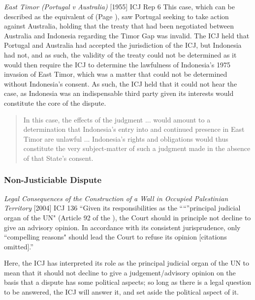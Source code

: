 \begin{casedetails}{\textit{East Timor (Portugal v Australia)} [1955] ICJ Rep 6}
    \flushleft
    This case, which can be described as the equivalent of  (Page \pageref{case:Horta v Commonwealth}), saw Portugal seeking to take action against Australia, holding that the treaty that had been negotiated between Australia and Indonesia regarding the Timor Gap was invalid. The ICJ held that Portugal and Australia had accepted the jurisdiction of the ICJ, but Indonesia had not, and as such, the validity of the treaty could not be determined as it would then require the ICJ to determine the lawfulness of Indonesia's 1975 invasion of East Timor, which was a matter that could not be determined without Indonesia's consent. As such, the ICJ held that it could not hear the case, as Indonesia was an indispensable third party given its interests would constitute the core of the dispute.

    \begin{quote}
        In this case, the effects of the judgment ... would amount to a determination that Indonesia's entry into and continued presence in East Timor are unlawful ... Indonesia's rights and obligations would thus constitute the very subject-matter of such a judgment made in the absence of that State's consent.
    \end{quote}
\end{casedetails}

\subsubsection{Non-Justiciable Dispute}
\begin{casedetails}{\textit{Legal Consequences of the Construction of a Wall in Occupied Palestinian Territory} [2004] ICJ 136}
    \flushleft
    ``Given its responsibilities as the ``“''principal judicial organ of the UN" (Article 92 of the ), the Court should in principle not decline to give an advisory opinion. In accordance with its consistent jurisprudence, only ``compelling reasons" should lead the Court to refuse its opinion [citations omitted].''

    \vspace{\baselineskip}

    Here, the ICJ has interpreted its role as the principal judicial organ of the UN to mean that it should not decline to give a judgement/advisory opinion on the basis that a dispute has some political aspects; so long as there is a legal question to be answered, the ICJ will answer it, and set aside the political aspect of it.
\end{casedetails}

